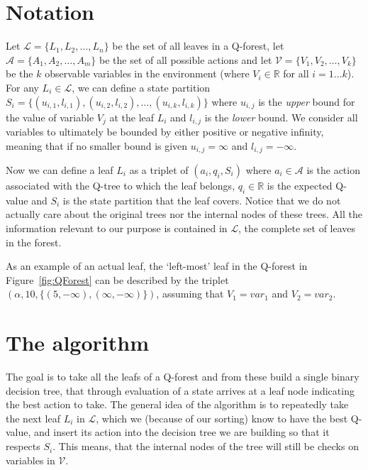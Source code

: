 \documentclass{article}
\begin{document}
\section{Notation}

Let $\mathcal{L} = \{ L_1, L_2, \ldots, L_n \}$ be the set of all leaves in a
Q-forest, let $\mathcal{A} = \{ A_1, A_2, \ldots, A_m \}$ be the set of all
possible actions and let $\mathcal{V} = \{ V_1, V_2, \ldots, V_k \}$ be the $k$
observable variables in the environment (where $V_i \in \mathbb{R}$ for all
$i=1\ldots k$). For any $L_i \in \mathcal{L}$, we can define a state partition
$S_i = \{ (u_{i,1}, l_{i,1}), (u_{i,2}, l_{i,2}), \ldots, (u_{i,k}, l_{i,k})\}$
where $u_{i,j}$ is the \textit{upper} bound for the value of variable $V_{j}$ at
the leaf $L_i$ and $l_{i,j}$ is the \textit{lower} bound. We consider all
variables to ultimately be bounded by either positive or negative infinity,
meaning that if no smaller bound is given $u_{i,j} = \infty$ and $l_{i,j} =
-\infty$.

Now we can define a leaf $L_i$ as a triplet of $(a_i, q_i, S_i)$ where $a_i \in
\mathcal{A}$ is the action associated with the Q-tree to which the leaf belongs,
$q_i \in \mathbb{R} $ is the expected Q-value and $S_i$ is the state partition
that the leaf covers. Notice that we do not actually care about the original
trees nor the internal nodes of these trees. All the information relevant to our
purpose is contained in $\mathcal{L}$, the complete set of leaves in the forest.

As an example of an actual leaf, the `left-most' leaf in the Q-forest in
Figure~\ref{fig:QForest} can be described by the triplet $(\alpha, 10, \{
(5, -\infty), (\infty, -\infty)\})$, assuming that $V_1 = var_1$ and $V_2 =
var_2$.

\section{The algorithm}

The goal is to take all the leafs of a Q-forest and from these build a single
binary decision tree, that through evaluation of a state arrives at a leaf node
indicating the best action to take. The general idea of the algorithm is to
repeatedly take the next leaf $L_i$ in $\mathcal{L}$, which we (because of our
sorting) know to have the best Q-value, and insert its action into the decision
tree we are building so that it respects $S_i$. This means, that the internal
nodes of the tree will still be checks on variables in $\mathcal{V}$.
\end{document}
